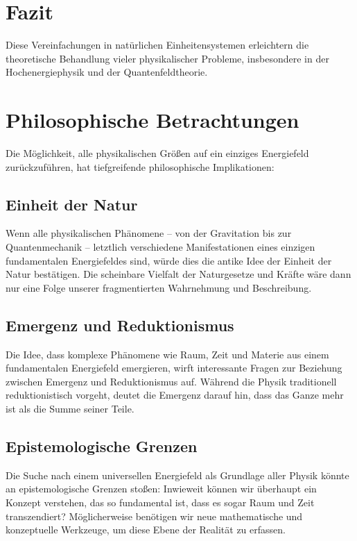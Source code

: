 \documentclass{article}
\begin{document}
	\section{Fazit}
	Diese Vereinfachungen in natürlichen Einheitensystemen erleichtern die theoretische Behandlung vieler physikalischer Probleme, insbesondere in der Hochenergiephysik und der Quantenfeldtheorie.
	
	
	
	\section{Philosophische Betrachtungen}
	
	Die Möglichkeit, alle physikalischen Größen auf ein einziges Energiefeld zurückzuführen, hat tiefgreifende philosophische Implikationen:
	
	\subsection{Einheit der Natur}
	
	Wenn alle physikalischen Phänomene – von der Gravitation bis zur Quantenmechanik – letztlich verschiedene Manifestationen eines einzigen fundamentalen Energiefeldes sind, würde dies die antike Idee der Einheit der Natur bestätigen. Die scheinbare Vielfalt der Naturgesetze und Kräfte wäre dann nur eine Folge unserer fragmentierten Wahrnehmung und Beschreibung.
	
	\subsection{Emergenz und Reduktionismus}
	
	Die Idee, dass komplexe Phänomene wie Raum, Zeit und Materie aus einem fundamentalen Energiefeld emergieren, wirft interessante Fragen zur Beziehung zwischen Emergenz und Reduktionismus auf. Während die Physik traditionell reduktionistisch vorgeht, deutet die Emergenz darauf hin, dass das Ganze mehr ist als die Summe seiner Teile.
	
	\subsection{Epistemologische Grenzen}
	
	Die Suche nach einem universellen Energiefeld als Grundlage aller Physik könnte an epistemologische Grenzen stoßen: Inwieweit können wir überhaupt ein Konzept verstehen, das so fundamental ist, dass es sogar Raum und Zeit transzendiert? Möglicherweise benötigen wir neue mathematische und konzeptuelle Werkzeuge, um diese Ebene der Realität zu erfassen.
	
\end{document}
